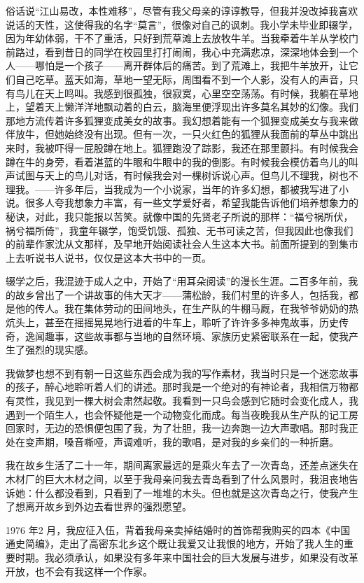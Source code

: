 \documentclass[fontset=fandol,12pt,a5paper]{ctexbook}
\begin{document}
俗话说“江山易改，本性难移”，尽管有我父母亲的谆谆教导，但我并没改掉我喜欢说话的天性，这使得我的名字“莫言”，很像对自己的讽刺。我小学未毕业即辍学，因为年幼体弱，干不了重活，只好到荒草滩上去放牧牛羊。当我牵着牛羊从学校门前路过，看到昔日的同学在校园里打打闹闹，我心中充满悲凉，深深地体会到一个人——哪怕是一个孩子——离开群体后的痛苦。到了荒滩上，我把牛羊放开，让它们自己吃草。蓝天如海，草地一望无际，周围看不到一个人影，没有人的声音，只有鸟儿在天上鸣叫。我感到很孤独，很寂寞，心里空空荡荡。有时候，我躺在草地上，望着天上懒洋洋地飘动着的白云，脑海里便浮现出许多莫名其妙的幻像。我们那地方流传着许多狐狸变成美女的故事。我幻想着能有一个狐狸变成美女与我来做伴放牛，但她始终没有出现。但有一次，一只火红色的狐狸从我面前的草丛中跳出来时，我被吓得一屁股蹲在地上。狐狸跑没了踪影，我还在那里颤抖。有时候我会蹲在牛的身旁，看着湛蓝的牛眼和牛眼中的我的倒影。有时候我会模仿着鸟儿的叫声试图与天上的鸟儿对话，有时候我会对一棵树诉说心声。但鸟儿不理我，树也不理我。——许多年后，当我成为一个小说家，当年的许多幻想，都被我写进了小说。很多人夸我想象力丰富，有一些文学爱好者，希望我能告诉他们培养想象力的秘诀，对此，我只能报以苦笑。就像中国的先贤老子所说的那样：“福兮祸所伏，祸兮福所倚”，我童年辍学，饱受饥饿、孤独、无书可读之苦，但我因此也像我们的前辈作家沈从文那样，及早地开始阅读社会人生这本大书。前面所提到的到集市上去听说书人说书，仅仅是这本大书中的一页。

辍学之后，我混迹于成人之中，开始了“用耳朵阅读”的漫长生涯。二百多年前，我的故乡曾出了一个讲故事的伟大天才——蒲松龄，我们村里的许多人，包括我，都是他的传人。我在集体劳动的田间地头，在生产队的牛棚马厩，在我爷爷奶奶的热炕头上，甚至在摇摇晃晃地行进着的牛车上，聆听了许许多多神鬼故事，历史传奇，逸闻趣事，这些故事都与当地的自然环境、家族历史紧密联系在一起，使我产生了强烈的现实感。

我做梦也想不到有朝一日这些东西会成为我的写作素材，我当时只是一个迷恋故事的孩子，醉心地聆听着人们的讲述。那时我是一个绝对的有神论者，我相信万物都有灵性，我见到一棵大树会肃然起敬。我看到一只鸟会感到它随时会变化成人，我遇到一个陌生人，也会怀疑他是一个动物变化而成。每当夜晚我从生产队的记工房回家时，无边的恐惧便包围了我，为了壮胆，我一边奔跑一边大声歌唱。那时我正处在变声期，嗓音嘶哑，声调难听，我的歌唱，是对我的乡亲们的一种折磨。

我在故乡生活了二十一年，期间离家最远的是乘火车去了一次青岛，还差点迷失在木材厂的巨大木材之间，以至于我母亲问我去青岛看到了什么风景时，我沮丧地告诉她：什么都没看到，只看到了一堆堆的木头。但也就是这次青岛之行，使我产生了想离开故乡到外边去看世界的强烈愿望。

1976 年2 月，我应征入伍，背着我母亲卖掉结婚时的首饰帮我购买的四本《中国通史简编》，走出了高密东北乡这个既让我爱又让我恨的地方，开始了我人生的重要时期。我必须承认，如果没有多年来中国社会的巨大发展与进步，如果没有改革开放，也不会有我这样一个作家。
\end{document}
